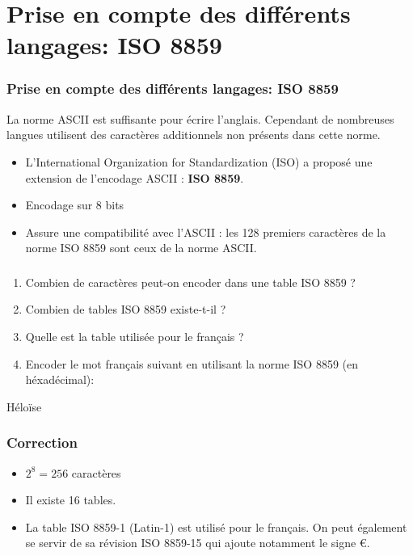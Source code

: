 \documentclass[svgnames,11pt]{beamer}
\begin{document}
\section{Prise en compte des différents langages: ISO 8859}
\begin{frame}
    \frametitle{Prise en compte des différents langages: ISO 8859}

    La norme ASCII est suffisante pour écrire l’anglais. Cependant de nombreuses langues utilisent
des caractères additionnels non présents dans cette norme.
\begin{aretenir}[]
\begin{itemize}
    \item L’International Organization for Standardization (ISO) a  proposé une extension de l’encodage ASCII : \textbf{ISO 8859}. 
    \item Encodage sur 8 bits 
    \item Assure une compatibilité avec l’ASCII : les 128 premiers caractères de la norme ISO 8859 sont ceux de la norme ASCII.
\end{itemize}
\end{aretenir}

\end{frame}
\begin{frame}
    \frametitle{}

    \begin{activite}
    \begin{enumerate}
        \item Combien de caractères peut-on encoder dans une table ISO 8859 ?
        \item Combien de tables ISO 8859 existe-t-il ?
        \item Quelle est la table utilisée pour le français ?
        \item Encoder le mot français suivant en utilisant la norme ISO 8859 (en héxadécimal):
    \end{enumerate}
    \begin{center}
        Héloïse
    \end{center}
    \end{activite}

\end{frame}
\begin{frame}
    \frametitle{Correction}
\begin{itemize}
    \item $2^8=256$ caractères
    \item Il existe 16 tables.
    \item La table ISO 8859-1 (Latin-1) est utilisé pour le français. On peut également se servir de sa révision ISO 8859-15 qui ajoute notamment le signe €.
\end{itemize}
    

\end{frame}
\end{document}
